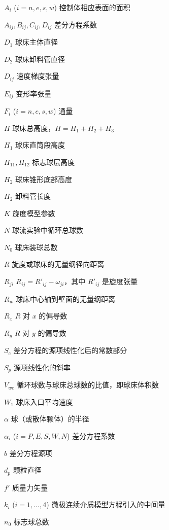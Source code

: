 \documentclass[degree=postdoc]{sysuthesis}
\begin{document}
\tableofcontents

\begin{denotation}[10em]
  \item[$A_i$ ($i = n, e, s, w$)] 控制体相应表面的面积
  \item[$A_{ij}, B_{ij}, C_{ij}, D_{ij}$] 差分方程系数
  \item[$D_1$] 球床主体直径
  \item[$D_2$] 球床卸料管直径
  \item[$D_{ij}$] 速度梯度张量
  \item[$E_{ij}$] 变形率张量
  \item[$F_i$ ($i = n, e, s, w$)] 通量
  \item[$H$] 球床总高度，$H = H_1 + H_2 + H_3$
  \item[$H_1$] 球床直筒段高度
  \item[$H_{11}, H_{12}$] 标志球层高度
  \item[$H_2$] 球床锥形底部高度
  \item[$H_2$] 卸料管长度
  \item[$K$] 旋度模型参数
  \item[$N$] 球流实验中循环总球数
  \item[$N_0$] 球床装球总数
  \item[$R$] 旋度或球床的无量纲径向距离
  \item[$R_{ji}$] $R_{ij} = R'_{ij} - \omega_{ji}$，其中 $R'_{ij}$ 是旋度张量
  \item[$R_w$] 球床中心轴到壁面的无量纲距离
  \item[$R_x$] $R$ 对 $x$ 的偏导数
  \item[$R_y$] $R$ 对 $y$ 的偏导数
  \item[$S_c$] 差分方程的源项线性化后的常数部分
  \item[$S_p$] 源项线性化的斜率
  \item[$V_{wc}$] 循环球数与球床总球数的比值，即球床体积数
  \item[$W_1$] 球床入口平均速度
  \item[$\alpha$] 球（或散体颗体）的半径
  \item[$\alpha_i$ ($i = P, E, S, W, N$)] 差分方程系数
  \item[$b$] 差分方程源项
  \item[$d_p$] 颗粒直径
  \item[$f'$] 质量力矢量
  \item[$k_i$ ($i = 1, \dots, 4$)] 微极连续介质模型方程引入的中间量
  \item[$n_0$] 标志球总数
\end{denotation}
\end{document}
